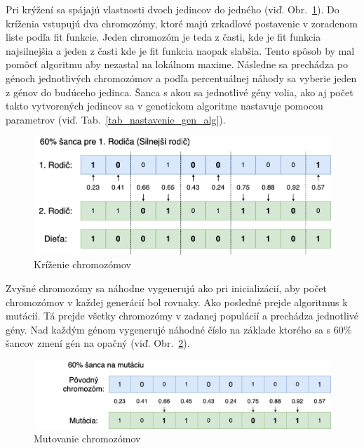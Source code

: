 \documentclass[runningheads]{llncs}
\begin{document}
Pri krýžení sa spájajú vlastnosti dvoch jedincov do jedného (viď. Obr.~\ref{fig_ga_krizenie}).
Do kríženia vstupujú dva chromozómy, ktoré majú zrkadlové postavenie v zoradenom liste podľa fit funkcie. 
Jeden chromozóm je teda z časti, kde je fit funkcia najsilnejšia a jeden z časti kde je fit funkcia naopak slabšia. 
Tento spôsob by mal pomôcť algoritmu aby nezastal na lokálnom maxime. Následne sa prechádza po génoch 
jednotlivých chromozómov a podľa percentuálnej náhody sa vyberie jeden z génov do budúceho jedinca.
Šanca s akou sa jednotlivé gény volia, ako aj počet takto vytvorených jedincov sa v genetickom algoritme
nastavuje pomocou parametrov (viď. Tab.~\ref{tab_nastavenie_gen_alg}). 

\begin{figure}
\includegraphics[width=\textwidth]{image/krizenie.png}
\caption{Kríženie chromozómov} \label{fig_ga_krizenie}
\end{figure}

Zvyšné chromozómy sa náhodne vygenerujú ako pri inicializácií, aby počet chromozómov v každej generácií bol rovnaky. 
Ako posledné prejde algoritmus k mutácií. Tá prejde všetky chromozómy v zadanej populácií a prechádza jednotlivé gény.
Nad každým génom vygenerujé náhodné číslo na základe ktorého sa s 60\% šancov zmení gén na opačný (viď. Obr.~\ref{fig_ga_mutovanie}). 

\begin{figure}
\includegraphics[width=\textwidth]{image/mutacia.png}
\caption{Mutovanie chromozómov} \label{fig_ga_mutovanie}
\end{figure}

\end{document}
